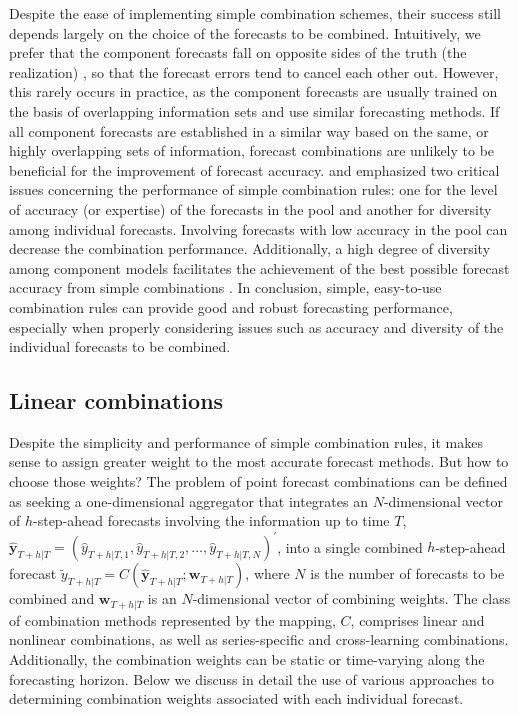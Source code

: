 \documentclass[a4paper,11pt]{article}
\begin{document}
Despite the ease of implementing simple combination schemes, their success still depends largely on the choice of the forecasts to be combined. Intuitively, we prefer that the component forecasts fall on opposite sides of the truth (the realization) \citep{Bates1969-yj,Larrick2006-sr}, so that the forecast errors tend to cancel each other out. However, this rarely occurs in practice, as the component forecasts are usually trained on the basis of overlapping information sets and use similar forecasting methods. If all component forecasts are established in a similar way based on the same, or highly overlapping sets of information, forecast combinations are unlikely to be beneficial for the improvement of forecast accuracy. \citet{Mannes2014-dl} and \citet{Lichtendahl2020-ut} emphasized two critical issues concerning the performance of simple combination rules: one for the level of accuracy (or expertise) of the forecasts in the pool and another for diversity among individual forecasts. Involving forecasts with low accuracy in the pool can decrease the combination performance. Additionally, a high degree of diversity among component models facilitates the achievement of the best possible forecast accuracy from simple combinations \citep{Thomson2019-al}. In conclusion, simple, easy-to-use combination rules can provide good and robust forecasting performance, especially when properly considering issues such as accuracy and diversity of the individual forecasts to be combined.

\subsection{Linear combinations}
\label{sec:linear_comb}

Despite the simplicity and performance of simple combination rules, it makes sense to assign greater weight to the most accurate forecast methods. But how to choose those weights? The problem of point forecast combinations can be defined as seeking a one-dimensional aggregator that integrates an $N$-dimensional vector of $h$-step-ahead forecasts involving the information up to time $T$, $\hat{\bm{y}}_{T+h|T}=\left(\hat{y}_{T+h|T, 1}, \hat{y}_{T+h|T, 2}, \dots, \hat{y}_{T+h|T, N}\right)^{\prime}$, into a single combined $h$-step-ahead forecast $\tilde{y}_{T+h|T}=C\left(\hat{\bm{y}}_{T+h|T} ; \bm{w}_{T+h|T}\right)$, where $N$ is the number of forecasts to be combined and $\bm{w}_{T+h|T}$ is an $N$-dimensional vector of combining weights. The class of combination methods represented by the mapping, $C$, comprises linear and nonlinear combinations, as well as series-specific and cross-learning combinations. Additionally, the combination weights can be static or time-varying along the forecasting horizon. Below we discuss in detail the use of various approaches to determining combination weights associated with each individual forecast.
\end{document}
